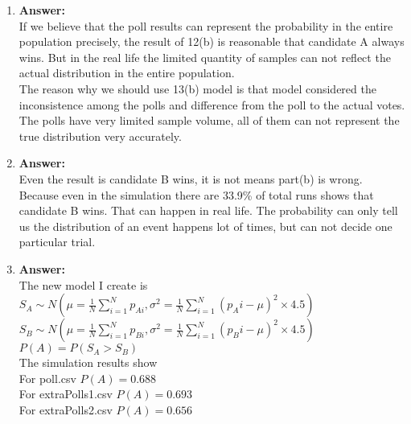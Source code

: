 \documentclass{article}
\newcommand{\myansw}{\textbf{Answer:}\\}
\begin{document}
\begin{enumerate}
\begin{enumerate}
		\item
		\myansw
		If we believe that the poll results can represent the probability in the entire population precisely, the result of 12(b) is reasonable that candidate A always wins. But in the real life the limited quantity of samples can not reflect the actual distribution in the entire population.\\
		The reason why we should use 13(b) model is that model considered the inconsistence among the polls and difference from the poll to the actual votes. The polls have very limited sample volume, all of them can not represent the true distribution very accurately.
		\item
		\myansw
		Even the result is candidate B wins, it is not means part(b) is wrong. Because even in the simulation there are 33.9\% of total runs shows that candidate B wins. That can happen in real life.
		The probability can only tell us the distribution of an event happens lot of times, but can not decide one particular trial.
		\item
		\myansw
		The new model I create is\\
		${S_A \sim N(\mu = \frac{1}{N}\sum\limits_{i=1}^N p_{Ai}, \sigma^2  = \frac{1}{N} \sum\limits_{i = 1}^N (p_Ai - \mu)^2\times 4.5)}$\\
		${S_B \sim N(\mu = \frac{1}{N}\sum\limits_{i=1}^N p_{Bi}, \sigma^2  = \frac{1}{N} \sum\limits_{i = 1}^N (p_Bi - \mu)^2\times 4.5)}$\\
		${P(A) = P(S_A > S_B)}$\\
		The simulation results show\\
		For poll.csv ${P(A) = 0.688}$\\
		For extraPolls1.csv ${P(A) = 0.693}$\\
		For extraPolls2.csv ${P(A) = 0.656}$\\
		
		
		
	\end{enumerate}

\end{enumerate}

\newpage
\end{document}
